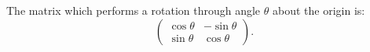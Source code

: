 The matrix which performs a rotation through angle $ \theta $
about the origin is:
\[ 
\left( 
\begin{array}{cc} 
  \cos \theta &  - \sin \theta \\
  \sin \theta & \cos \theta 
\end{array} 
\right ) . \]